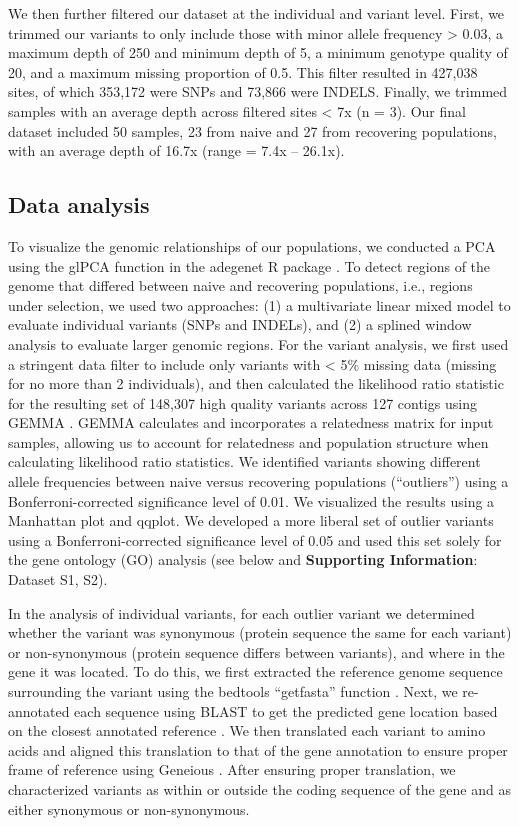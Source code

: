 \documentclass[9pt,twocolumn,twoside,lineno]{pnas-new}
\begin{document}
{We then further filtered our dataset at the individual and variant
level. First, we trimmed our variants to only include those with minor
allele frequency \textgreater{} 0.03, a maximum depth of 250 and minimum
depth of 5, a minimum genotype quality of 20, and a maximum missing
proportion of 0.5. This filter resulted in 427,038 sites, of which
353,172 were SNPs and 73,866 were INDELS. Finally, we trimmed samples
with an average depth across filtered sites \textless{} 7x (n = 3). Our
final dataset included 50 samples, 23 from naive and 27 from recovering
populations, with an average depth of 16.7x (range = 7.4x -- 26.1x).

\hypertarget{data-analysis}{%
\subsection*{Data analysis}\label{data-analysis}}

To visualize the genomic relationships of our populations, we conducted
a PCA using the glPCA function in the adegenet R package
\citep{jombart2008}. To detect regions of the genome that differed
between naive and recovering populations, i.e., regions under selection,
we used two approaches: (1) a multivariate linear mixed model to
evaluate individual variants (SNPs and INDELs), and (2) a splined window
analysis to evaluate larger genomic regions. For the variant analysis,
we first used a stringent data filter to include only variants with
\textless{} 5\% missing data (missing for no more than 2 individuals),
and then calculated the likelihood ratio statistic for the resulting set
of 148,307 high quality variants across 127 contigs using GEMMA
\citep{zhou2014}. GEMMA calculates and incorporates a relatedness matrix
for input samples, allowing us to account for relatedness and population
structure when calculating likelihood ratio statistics. We identified
variants showing different allele frequencies between naive versus
recovering populations (``outliers'') using a Bonferroni-corrected
significance level of 0.01. We visualized the results using a Manhattan
plot and qqplot. We developed a more liberal set of outlier variants
using a Bonferroni-corrected significance level of 0.05 and used this
set solely for the gene ontology (GO) analysis (see below and
\textbf{Supporting Information}: Dataset S1, S2).

In the analysis of individual variants, for each outlier variant we
determined whether the variant was synonymous (protein sequence the same
for each variant) or non-synonymous (protein sequence differs between
variants), and where in the gene it was located. To do this, we first
extracted the reference genome sequence surrounding the variant using
the bedtools ``getfasta'' function \citep{quinlan2010}. Next, we
re-annotated each sequence using BLAST to get the predicted gene
location based on the closest annotated reference \citep{altschul1997}.
We then translated each variant to amino acids and aligned this
translation to that of the gene annotation to ensure proper frame of
reference using Geneious \citep{kearse2012}. After ensuring proper
translation, we characterized variants as within or outside the coding
sequence of the gene and as either synonymous or non-synonymous.

}
\end{document}

